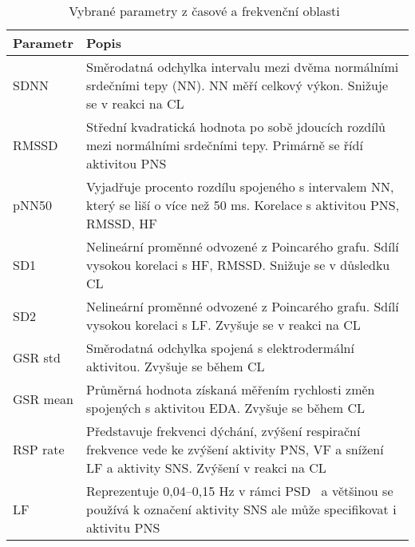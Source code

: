 \begin{table}[h!]
    \renewcommand{\arraystretch}{1.2}
    \scriptsize
    \centering
    \begin{threeparttable}
        \caption{Vybrané parametry z časové a frekvenční oblasti~\cite{Ishaque2021}}
        \label{tab:hrv_params}
        \begin{tabular}{p{2cm}p{12cm}}
            \toprule
            Parametr & Popis                                                                                                                                                        \\ \midrule
            SDNN     & Směrodatná odchylka intervalu mezi dvěma normálními srdečními tepy (NN). NN měří celkový výkon. Snižuje se v reakci na \gls{CL}                              \\
            RMSSD    & Střední kvadratická hodnota po sobě jdoucích rozdílů mezi normálními srdečními tepy. Primárně se řídí aktivitou \gls{PNS}                                    \\
            pNN50    & Vyjadřuje procento rozdílu spojeného s intervalem NN, který se liší o více než 50 ms. Korelace s aktivitou \gls{PNS}, RMSSD, HF                              \\
            SD1      & Nelineární proměnné odvozené z Poincarého grafu. Sdílí vysokou korelaci s HF, RMSSD. Snižuje se v důsledku \gls{CL}                                          \\
            SD2      & Nelineární proměnné odvozené z Poincarého grafu. Sdílí vysokou korelaci s LF. Zvyšuje se v reakci na \gls{CL}                                                \\
            GSR std  & Směrodatná odchylka spojená s elektrodermální aktivitou. Zvyšuje se během \gls{CL}                                                                           \\
            GSR mean & Průměrná hodnota získaná měřením rychlosti změn spojených s aktivitou EDA. Zvyšuje se během \gls{CL}                                                         \\
            RSP rate & Představuje frekvenci dýchání, zvýšení respirační frekvence vede ke zvýšení aktivity \gls{PNS}, VF a snížení LF a aktivity SNS. Zvýšení v reakci na \gls{CL} \\
            LF       & Reprezentuje 0,04--0,15 Hz v rámci PSD\tnote{1} ~a většinou se používá k označení aktivity \gls{SNS} ale může specifikovat i aktivitu \gls{PNS}              \\

\end{tabular}
\end{threeparttable}
\end{table}
